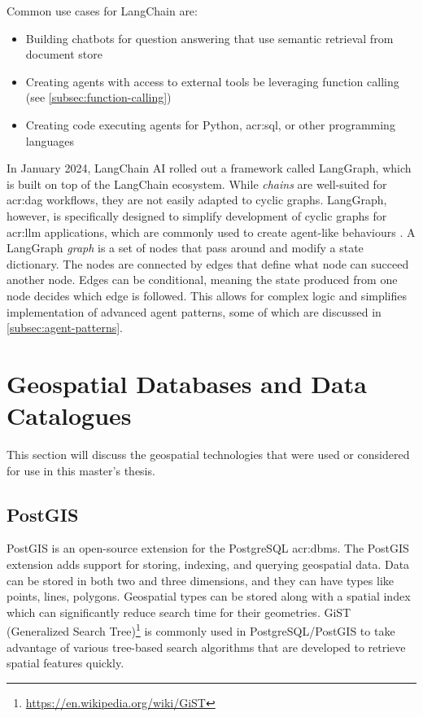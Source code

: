 Common use cases for LangChain are:

\begin{itemize}
    \item Building chatbots for question answering that use semantic retrieval from document store
    \item Creating agents with access to external tools be leveraging function calling (see \autoref{subsec:function-calling})
    \item Creating code executing agents for Python, \acrshort{acr:sql}, or other programming languages
\end{itemize}

In January 2024, LangChain AI rolled out a framework called LangGraph, which is built on top of the LangChain ecosystem. While \textit{chains} are well-suited for \gls{acr:dag} workflows, they are not easily adapted to cyclic graphs. LangGraph, however, is specifically designed to simplify development of cyclic graphs for \acrshort{acr:llm} applications, which are commonly used to create agent-like behaviours \citep{langchainaiLangchainaiLanggraph2024}. A LangGraph \textit{graph} is a set of nodes that pass around and modify a state dictionary. The nodes are connected by edges that define what node can succeed another node. Edges can be conditional, meaning the state produced from one node decides which edge is followed. This allows for complex logic and simplifies implementation of advanced agent patterns, some of which are discussed in \autoref{subsec:agent-patterns}.


\section{Geospatial Databases and Data Catalogues}
\label{sec:geo-dbs-and-data-catalogues}

This section will discuss the geospatial technologies that were used or considered for use in this master's thesis.

\subsection{PostGIS}
\label{subsec:postgis}

PostGIS \citep{PostGIS2001} is an open-source extension for the PostgreSQL \acrshort{acr:dbms}. The PostGIS extension adds support for storing, indexing, and querying geospatial data. Data can be stored in both two and three dimensions, and they can have types like points, lines, polygons. Geospatial types can be stored along with a spatial index which can significantly reduce search time for their geometries. GiST (Generalized Search Tree)\footnote{\url{https://en.wikipedia.org/wiki/GiST}} is commonly used in PostgreSQL/PostGIS to take advantage of various tree-based search algorithms that are developed to retrieve spatial features quickly.

